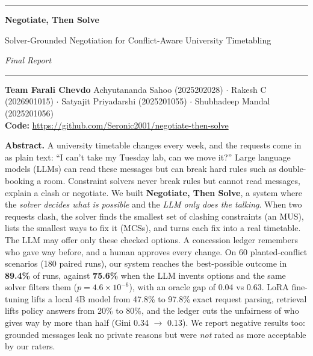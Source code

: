 \documentclass[10pt,a4paper]{article}
\begin{document}
\begin{center}
{\color{secblue}\rule{\textwidth}{0.8pt}}\par\vspace{1pt}
{\LARGE\bfseries Negotiate, Then Solve\par}
\vspace{1pt}
{\large Solver-Grounded Negotiation for Conflict-Aware University Timetabling\par}
\vspace{1pt}
{\normalsize\itshape Final Report\par}
{\color{secblue}\rule{\textwidth}{0.8pt}}\par
\vspace{2pt}
{\small\textbf{Team Farali Chevdo}\quad
Achyutananda Sahoo (2025202028) $\cdot$ Rakesh C (2026901015) $\cdot$
Satyajit Priyadarshi (2025201055) $\cdot$ Shubhadeep Mandal (2025201056)\\[1pt]
\textbf{Code:} \url{https://github.com/Seronic2001/negotiate-then-solve}\par}
\end{center}

\begin{keybox}
\small\textbf{Abstract.}
A university timetable changes every week, and the requests come in as
plain text: ``I can't take my Tuesday lab, can we move it?'' Large language
models (LLMs) can read these messages but can break hard rules such as
double-booking a room. Constraint solvers never break rules but cannot read
messages, explain a clash or negotiate. We built \textbf{Negotiate, Then
Solve}, a system where the \emph{solver decides what is possible} and the
\emph{LLM only does the talking}. When two requests clash, the solver finds
the smallest set of clashing constraints (an MUS), lists the smallest ways
to fix it (MCSs), and turns each fix into a real timetable. The LLM may offer
only these checked options. A concession ledger remembers who gave way
before, and a human approves every change. On 60 planted-conflict scenarios
(180 paired runs), our system reaches the best-possible outcome in
\textbf{89.4\%} of runs, against \textbf{75.6\%} when the LLM invents options
and the same solver filters them ($p{=}4.6{\times}10^{-6}$), with an oracle
gap of 0.04 vs 0.63. LoRA fine-tuning lifts a local 4B model from 47.8\% to
97.8\% exact request parsing, retrieval lifts policy answers from 20\% to
80\%, and the ledger cuts the unfairness of who gives way by more than half (Gini 0.34
$\to$ 0.13). We report negative results too: grounded messages leak no
private reasons but were \emph{not} rated as more acceptable by our raters.
\end{keybox}
\end{document}
